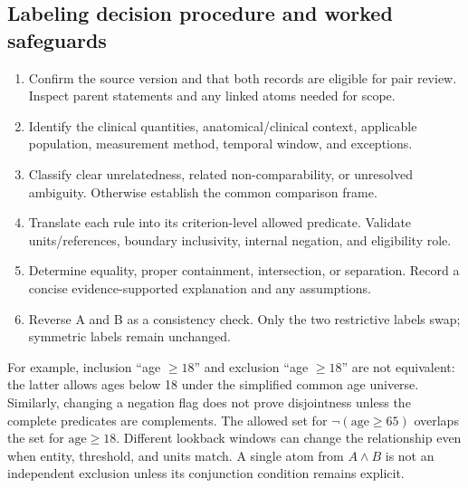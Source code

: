 \documentclass[10pt,letterpaper]{article}
\begin{document}
\subsection{Labeling decision procedure and worked safeguards}
\begin{enumerate}
\item Confirm the source version and that both records are eligible for pair
review. Inspect parent statements and any linked atoms needed for scope.
\item Identify the clinical quantities, anatomical/clinical context, applicable
population, measurement method, temporal window, and exceptions.
\item Classify clear unrelatedness, related non-comparability, or unresolved
ambiguity. Otherwise establish the common comparison frame.
\item Translate each rule into its criterion-level allowed predicate. Validate
units/references, boundary inclusivity, internal negation, and eligibility role.
\item Determine equality, proper containment, intersection, or separation.
Record a concise evidence-supported explanation and any assumptions.
\item Reverse A and B as a consistency check. Only the two restrictive labels
swap; symmetric labels remain unchanged.
\end{enumerate}

For example, inclusion ``age $\geq18$'' and exclusion ``age $\geq18$'' are
not equivalent: the latter allows ages below 18 under the simplified common
age universe. Similarly, changing a negation flag does not prove disjointness
unless the complete predicates are complements. The allowed set for
$\neg(\mathrm{age}\geq65)$ overlaps the set for $\mathrm{age}\geq18$.
Different lookback windows can change the relationship even when entity,
threshold, and units match. A single atom from $A\land B$ is not an
independent exclusion unless its conjunction condition remains explicit.
\end{document}
